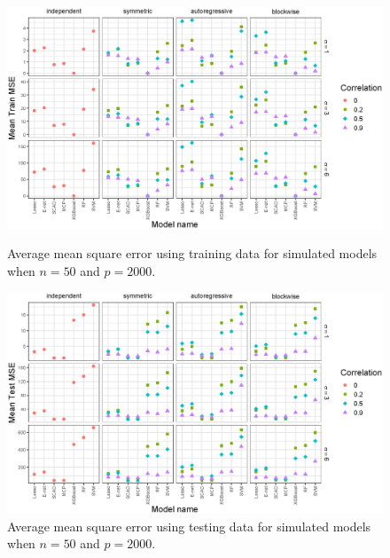 \documentclass{article}
\begin{document}
\begin{figure}[h!]
	\centering
	\includegraphics[width = \textwidth]{images/facet-train-mse/facet_train_mse_50_2000.eps}
	\captionsetup{width = 0.8\textwidth}
	\caption{Average mean square error using training data for simulated models when $n = 50$ and $p = 2000$.}
	\label{fig:train-mse-50-2000}
	
	\bigskip
	
	\includegraphics[width = \textwidth]{images/facet-test-mse/facet_test_mse_50_2000.eps}
	\captionsetup{width = 0.8\textwidth}
	\caption{Average mean square error using testing data for simulated models when $n = 50$ and $p = 2000$.}
	\label{fig:test-mse-50-2000}
\end{figure}
\end{document}
